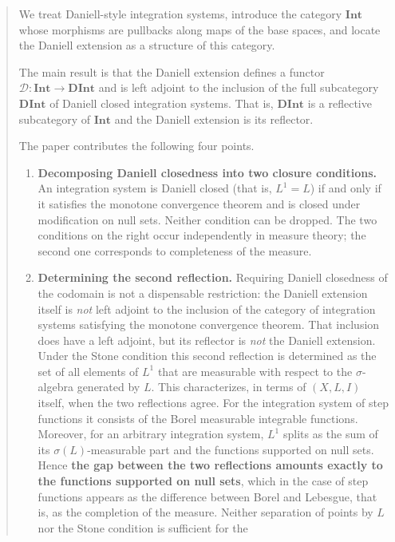 \begin{abstract}
We treat Daniell-style integration systems, introduce the category
$\mathbf{Int}$ whose morphisms are pullbacks along maps of the base spaces,
and locate the Daniell extension as a structure of this category.

The main result is that the Daniell extension defines a functor
$\mathcal{D}:\mathbf{Int}\to\mathbf{DInt}$ and is left adjoint to the inclusion
of the full subcategory $\mathbf{DInt}$ of Daniell closed integration systems.
That is, $\mathbf{DInt}$ is a reflective subcategory of $\mathbf{Int}$ and the
Daniell extension is its reflector.

The paper contributes the following four points.

\begin{enumerate}
  \item \textbf{Decomposing Daniell closedness into two closure conditions.}
    An integration system is Daniell closed (that is, $L^1=L$) if and only if it
    satisfies the monotone convergence theorem and is closed under modification
    on null sets. Neither condition can be dropped. The two conditions on the
    right occur independently in measure theory; the second one corresponds to
    completeness of the measure.
  \item \textbf{Determining the second reflection.}
    Requiring Daniell closedness of the codomain is not a dispensable
    restriction: the Daniell extension itself is \emph{not} left adjoint to the
    inclusion of the category of integration systems satisfying the monotone
    convergence theorem. That inclusion does have a left adjoint, but its
    reflector is \emph{not} the Daniell extension. Under the Stone condition
    this second reflection is determined as the set of all elements of $L^1$
    that are measurable with respect to the $\sigma$-algebra generated by $L$.
    This characterizes, in terms of $(X,L,I)$ itself, when the two reflections
    agree. For the integration system of step functions it consists of the
    Borel measurable integrable functions. Moreover, for an arbitrary
    integration system, $L^1$ splits as the sum of its $\sigma(L)$-measurable
    part and the functions supported on null sets. Hence \textbf{the gap between
    the two reflections amounts exactly to the functions supported on null
    sets}, which in the case of step functions appears as the difference between
    Borel and Lebesgue, that is, as the completion of the measure. Neither
    separation of points by $L$ nor the Stone condition is sufficient for the

\end{enumerate}
\end{abstract}
